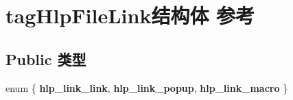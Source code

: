 \hypertarget{structtag_hlp_file_link}{}\section{tag\+Hlp\+File\+Link结构体 参考}
\label{structtag_hlp_file_link}
\subsection*{Public 类型}
\begin{DoxyCompactItemize}
\item 
\mbox{\label{structtag_hlp_file_link_af2b4251a3737af196bd93c6488cb5b42}} 
enum \{ {\bfseries hlp\+\_\+link\+\_\+link}, 
{\bfseries hlp\+\_\+link\+\_\+popup}, 
{\bfseries hlp\+\_\+link\+\_\+macro}
 \}
\end{DoxyCompactItemize}
